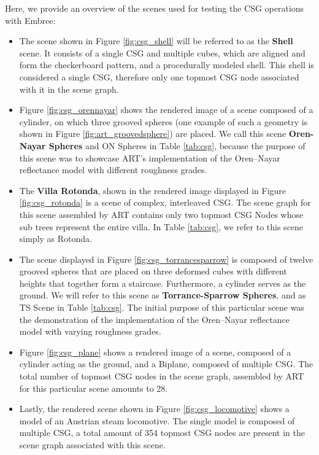 \noindent Here, we provide an overview of the scenes used for testing the CSG operations with Embree:
\begin{itemize}
	\setlength\itemsep{0.05em}
	
	\item The scene shown in Figure \ref{fig:csg_shell} will be referred to as the \textbf{Shell} scene.
	It consists of a single CSG and multiple cubes, which are aligned and form the checkerboard pattern, and a procedurally modeled shell. 
	 This shell is considered a single CSG, therefore only one topmost CSG node associated with it in the scene graph.
	
	
	\item  Figure \ref{fig:csg_orennayar} shows the rendered image of a scene composed of a cylinder, on which three grooved spheres (one example of such a geometry is shown in Figure \ref{fig:art_groovedsphere}) are placed. We call this scene \textbf{Oren-Nayar Spheres} and ON Spheres in Table \ref{tab:csg}, because the purpose of this scene was to showcase ART's implementation of the Oren–Nayar reflectance model \cite{oren1994generalization} with different roughness grades.
	
	\item The \textbf{Villa Rotonda}, shown in the rendered image displayed in Figure \ref{fig:csg_rotonda} is a scene of complex, interleaved CSG. The scene graph for this scene assembled by ART contains only two topmost CSG Nodes whose sub trees represent the entire villa.
	In Table \ref{tab:csg}, we refer to this scene simply as Rotonda.
		
	\item The scene displayed in Figure \ref{fig:csg_torrancesparrow} is composed of twelve grooved spheres that are placed on three deformed cubes with different heights that together form a staircase. Furthermore, a cylinder serves as the ground. We will refer to this scene as \textbf{Torrance-Sparrow Spheres}, and as TS Scene in Table \ref{tab:csg}. The initial purpose of this particular scene was the demonstration of the implementation of the Oren–Nayar reflectance model \cite{torrance1967theory} with varying roughness grades.
	
	\item Figure \ref{fig:csg_plane} shows a rendered image of a scene, composed of a cylinder acting as the ground, and a Biplane, composed of multiple CSG. The total number of topmost CSG nodes in the scene graph, assembled by ART for this particular scene amounts to 28.
	
	\item Lastly, the rendered scene shown in Figure \ref{fig:csg_locomotive} shows a model of an Austrian steam locomotive. The single model is composed of multiple CSG, a total amount of 354 topmost CSG nodes are present in the scene graph associated with this scene.
	
	
\end{itemize}

